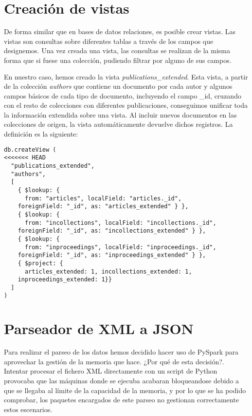 \section{Creación de vistas}\label{sec:parser}

De forma similar que en bases de datos relaciones, es posible crear vistas. Las vistas son consultas sobre diferentes tablas a través de los campos que designemos. Una vez creada una vista, las consultas se realizan de la misma forma que si fuese una colección, pudiendo filtrar por alguno de sus campos.

En nuestro caso, hemos creado la vista \textit{publications\_extended}. Esta vista, a partir de la colección \textit{authors} que contiene un documento por cada autor y algunos campos básicos de cada tipo de documento, incluyendo el campo \_id, cruzando con el resto de colecciones con diferentes publicaciones, conseguimos unificar toda la información extendida sobre una vista. Al incluir nuevos documentos en las colecciones de origen, la vista automáticamente devuelve dichos registros. La definición es la siguiente:

\begin{verbatim}
db.createView (
<<<<<<< HEAD
  "publications_extended",
  "authors",
  [
    { $lookup: { 
      from: "articles", localField: "articles._id",
	foreignField: "_id", as: "articles_extended" } },
    { $lookup: { 
      from: "incollections", localField: "incollections._id", 
	foreignField: "_id", as: "incollections_extended" } },
    { $lookup: { 
      from: "inproceedings", localField: "inproceedings._id",
	foreignField: "_id", as: "inproceedings_extended" } },
    { $project: { 
      articles_extended: 1, incollections_extended: 1,
	inproceedings_extended: 1}}
  ]
)
\end{verbatim}


\section{Parseador de XML a JSON}\label{sec:parser}

Para realizar el parseo de los datos hemos decidido hacer uso de PySpark para aprovechar la gestión de la memoria que hace. ¿Por qué de esta decisión?. Intentar procesar el fichero \gls{XML} directamente con un script de Python provocaba que las máquinas donde se ejecuba acabaran bloqueandose debido a que se llegaba al límite de la capacidad de la memoria, y por lo que se ha podido comprobar, los paquetes encargados de este parseo no gestionan correctamente estos escenarios.


